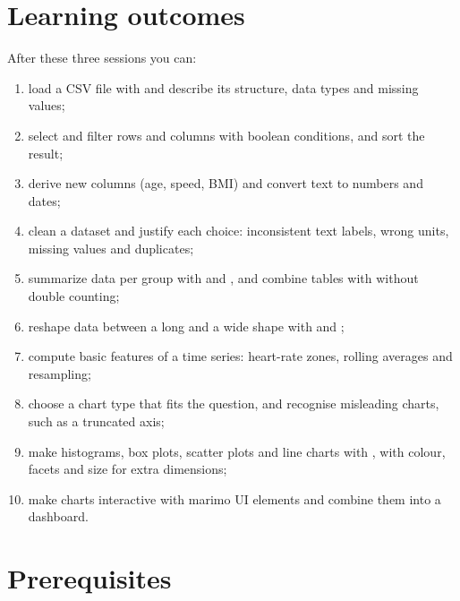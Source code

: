 \documentclass[11pt,a4paper]{article}
\begin{document}



\section{Learning outcomes}

After these three sessions you can:

\begin{enumerate}[label=\textbf{LO\arabic*}, leftmargin=1.4cm]
  \item load a CSV file with  and describe its structure,
        data types and missing values;
  \item select and filter rows and columns with boolean conditions, and
        sort the result;
  \item derive new columns (age, speed, BMI) and convert text to numbers
        and dates;
  \item clean a dataset and justify each choice: inconsistent text
        labels, wrong units, missing values and duplicates;
  \item summarize data per group with  and , and
        combine tables with  without double counting;
  \item reshape data between a long and a wide shape with 
        and ;
  \item compute basic features of a time series: heart-rate zones,
        rolling averages and resampling;
  \item choose a chart type that fits the question, and recognise
        misleading charts, such as a truncated axis;
  \item make histograms, box plots, scatter plots and line charts with
        , with colour, facets and size for extra
        dimensions;
  \item make charts interactive with marimo UI elements and combine them
        into a dashboard.
\end{enumerate}

\section{Prerequisites}
\end{document}

